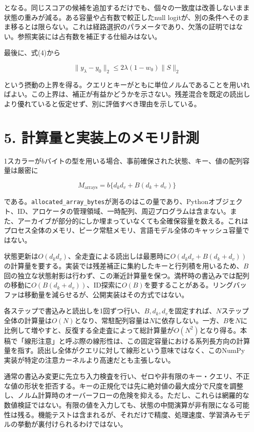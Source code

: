 \documentclass[11pt,a4paper]{article}
\begin{document}
となる。同じスコアの候補を追加するだけでも、個々の一致度は改善しないまま状態の重みが減る。ある容量や占有数で較正したnull logitが、別の条件へそのまま移るとは限らない。これは経路選択のパラメータであり、欠落の証明ではない。参照実装には占有数を補正する仕組みはない。

最後に、式(4)から

\nopagebreak[4]

\[
\|y_{\lambda}-y_0\|_2\leq
2\lambda(1-w_0)\|S\|_2
\tag{13}
\]

という摂動の上界を得る。クエリとキーがともに単位ノルムであることを用いればよい。この上界は、補正が有益かどうかを示さない。残差混合を既定の読出しより優れていると仮定せず、別に評価すべき理由を示している。

\section{5. 計算量と実装上のメモリ計測}\label{ux8a08ux7b97ux91cfux3068ux5b9fux88c5ux4e0aux306eux30e1ux30e2ux30eaux8a08ux6e2c}

1スカラーが\(b\)バイトの型を用いる場合、事前確保された状態、キー、値の配列容量は厳密に

\nopagebreak[4]

\[
M_{\mathrm{arrays}}=b\{d_kd_v+B(d_k+d_v)\}
\tag{14}
\]

である。\texttt{allocated\_array\_bytes}が測るのはこの量であり、Pythonオブジェクト、ID、アロケータの管理領域、一時配列、周辺プログラムは含まない。また、アーカイブが部分的にしか埋まっていなくても全確保容量を数える。これはプロセス全体のメモリ、ピーク常駐メモリ、言語モデル全体のキャッシュ容量ではない。

状態更新は\(O(d_kd_v)\)、全走査による読出しは最悪時に\(O(d_kd_v+B(d_k+d_v))\)の計算量を要する。実装では残差補正に集約したキーと行列積を用いるため、\(B\)回の独立な状態射影は行わず、この漸近計算量を保つ。満杯時の書込みでは配列の移動に\(O(B(d_k+d_v))\)、ID探索に\(O(B)\)を要することがある。リングバッファは移動量を減らせるが、公開実装はその方式ではない。

各ステップで書込みと読出しを1回ずつ行い、\(B,d_k,d_v\)を固定すれば、\(N\)ステップ全体の計算量は\(O(N)\)となり、常駐配列容量は\(N\)に依存しない。一方、\(B\)を\(N\)に比例して増やすと、反復する全走査によって総計算量が\(O(N^2)\)となり得る。本稿で「線形注意」と呼ぶ際の線形性は、この固定容量における系列長方向の計算量を指す。読出し全体がクエリに対して線形という意味ではなく、このNumPy実装が特定の注意カーネルより高速だとも主張しない。

通常の書込み変更に先立ち入力検査を行い、ゼロや非有限のキー・クエリ、不正な値の形状を拒否する。キーの正規化では先に絶対値の最大成分で尺度を調整し、ノルム計算時のオーバーフローの危険を抑える。ただし、これらは網羅的な数値検証ではない。有限の値を入力しても、状態の中間演算が非有限になる可能性は残る。機能テストは含まれるが、それだけで精度、処理速度、学習済みモデルの挙動が裏付けられるわけではない。
\end{document}
